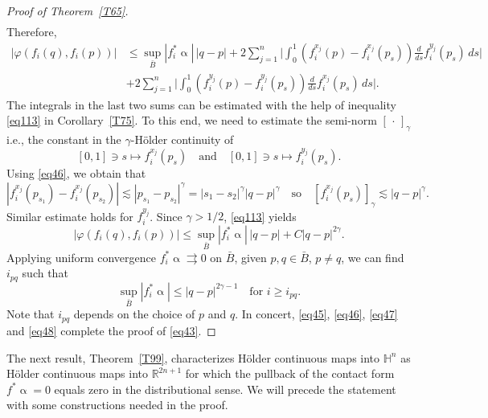 \documentclass[intlimits,12pt,reqno]{amsart}
\newcommand{\bbbh}{\mathbb H}
\newcommand{\R}{\mathbb R}
\numberwithin{equation}{section}
\theoremstyle{definition}
\begin{document}
\begin{proof}[Proof of Theorem~\ref{T65}]
\begin{equation*}
\begin{split}
\end{split}
\end{equation*}
Therefore,
\begin{equation}
\label{eq68}
\begin{split}
|\varphi(f_i(q),f_i(p))|
&\leq
\sup_{\bar{B}} |f_i^*\upalpha|\, |q-p|
+
2\sum_{j=1}^n\Bigg|\int_0^1 (f_i^{x_j}(p)-f_i^{x_j}(p_s))\frac{d}{ds}f_i^{y_j}(p_s)\, ds\Bigg|\\
&+
2\sum_{j=1}^n\Bigg|\int_0^1 (f_i^{y_j}(p)-f_i^{y_j}(p_s))\frac{d}{ds}f_i^{x_j}(p_s)\, ds\Bigg|.
\end{split}    
\end{equation}
The integrals in the last two sums can be estimated with the help of inequality \eqref{eq113} in Corollary~\ref{T75}.
To this end, we need to estimate the semi-norm $[\,\cdot\,]_{\gamma}$ i.e., the constant in the $\gamma$-H\"older continuity of
\begin{equation}
\label{eq44}
[0,1]\ni s\mapsto f_i^{x_j}(p_s)
\quad
\text{and}
\quad
[0,1]\ni s\mapsto f_i^{y_j}(p_s).
\end{equation}
Using \eqref{eq46}, we obtain that 
$$
|f_i^{x_j}(p_{s_1})-f_i^{x_j}(p_{s_2})|\lesssim 
|p_{s_1}-p_{s_2}|^\gamma=|s_1-s_2|^\gamma|q-p|^\gamma
\quad
\text{so}
\quad[f_i^{x_j}(p_s)]_{\gamma}\lesssim |q-p|^\gamma.
$$
Similar estimate holds for $f_i^{y_j}$. Since $\gamma>1/2$,  \eqref{eq113} yields 
\begin{equation}
\label{eq47}
|\varphi(f_i(q),f_i(p))|\leq
\sup_{\bar{B}} |f_i^*\upalpha|\, |q-p| +C|q-p|^{2\gamma}.
\end{equation}
Applying uniform convergence $f_i^*\upalpha\rightrightarrows 0$ on $\bar{B}$, 
given $p,q\in\bar{B}$, $p\neq q$, we can find $i_{pq}$ such that
\begin{equation}
\label{eq48}
\sup_{\bar{B}} |f_i^*\upalpha|\leq |q-p|^{2\gamma-1}
\quad
\text{for $i\geq i_{pq}$.}
\end{equation}
Note that $i_{pq}$ depends on the choice of $p$ and $q$.
In concert, \eqref{eq45}, \eqref{eq46}, \eqref{eq47} and \eqref{eq48} complete the proof of \eqref{eq43}.
\end{proof}

The next result, Theorem~\ref{T99}, characterizes H\"older continuous maps into $\bbbh^n$ as H\"older continuous maps into $\R^{2n+1}$ for which the pullback of the contact form $f^*\upalpha=0$ equals zero in the distributional sense.
We will precede the statement with some constructions needed in the proof.
\end{document}
